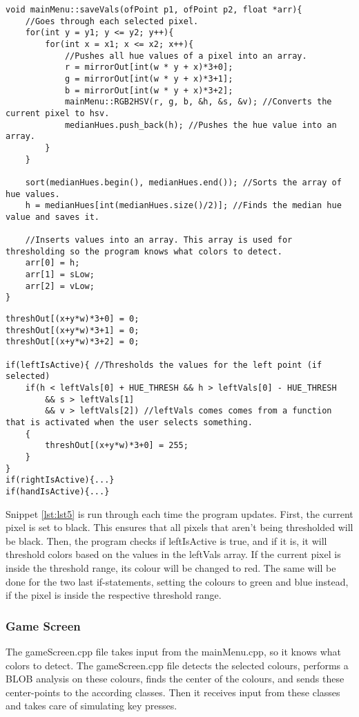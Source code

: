 \pagebreak[4]
\begin{lstlisting}[caption=saveVals function, label=lst:lst4]
void mainMenu::saveVals(ofPoint p1, ofPoint p2, float *arr){
    //Goes through each selected pixel.
    for(int y = y1; y <= y2; y++){
        for(int x = x1; x <= x2; x++){
            //Pushes all hue values of a pixel into an array.
            r = mirrorOut[int(w * y + x)*3+0];
            g = mirrorOut[int(w * y + x)*3+1];
            b = mirrorOut[int(w * y + x)*3+2];
            mainMenu::RGB2HSV(r, g, b, &h, &s, &v); //Converts the current pixel to hsv.
            medianHues.push_back(h); //Pushes the hue value into an array.
        }
    }

    sort(medianHues.begin(), medianHues.end()); //Sorts the array of hue values.
    h = medianHues[int(medianHues.size()/2)]; //Finds the median hue value and saves it.

    //Inserts values into an array. This array is used for thresholding so the program knows what colors to detect.
    arr[0] = h;
    arr[1] = sLow;
    arr[2] = vLow;
}
\end{lstlisting}

\begin{lstlisting}[caption=Thresholding, label=lst:lst5]
threshOut[(x+y*w)*3+0] = 0;
threshOut[(x+y*w)*3+1] = 0;
threshOut[(x+y*w)*3+2] = 0;

if(leftIsActive){ //Thresholds the values for the left point (if selected)
    if(h < leftVals[0] + HUE_THRESH && h > leftVals[0] - HUE_THRESH
        && s > leftVals[1]
        && v > leftVals[2]) //leftVals comes comes from a function that is activated when the user selects something.
    {
        threshOut[(x+y*w)*3+0] = 255;
    }
}
if(rightIsActive){...}
if(handIsActive){...}
\end{lstlisting}

Snippet \ref{lst:lst5} is run through each time the program updates. 
First, the current pixel is set to black. 
This ensures that all pixels that aren’t being thresholded will be black. 
Then, the program checks if leftIsActive is true, and if it is, it will threshold colors based on the values in the leftVals array. 
If the current pixel is inside the threshold range, its colour will be changed to red. 
The same will be done for the two last if-statements, setting the colours to green and blue instead, if the pixel is inside the respective threshold range.


\subsubsection*{Game Screen}
The gameScreen.cpp file takes input from the mainMenu.cpp, so it knows what colors to detect. 
The gameScreen.cpp file detects the selected colours, performs a BLOB analysis on these colours, finds the center of the colours, and sends these center-points to the according classes. 
Then it receives input from these classes and takes care of simulating key presses.
\bigskip

